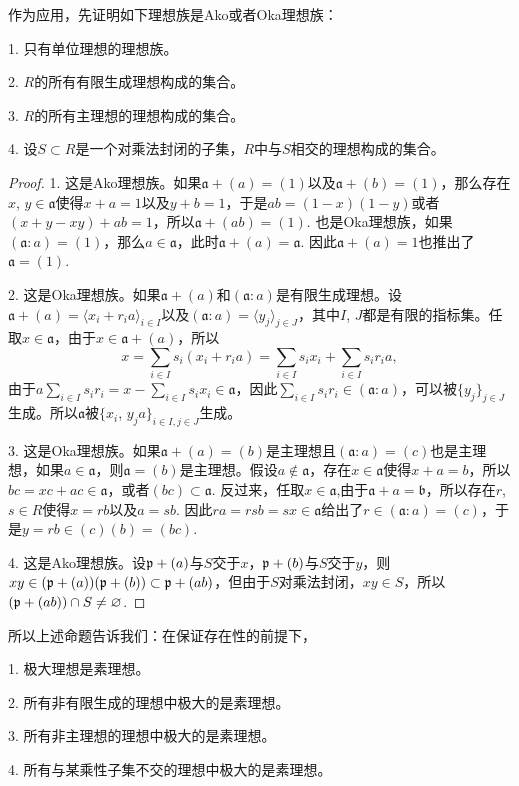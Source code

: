 作为应用，先证明如下理想族是Ako或者Oka理想族：

1. 只有单位理想的理想族。

2. $R$的所有有限生成理想构成的集合。

3. $R$的所有主理想的理想构成的集合。

4. 设$S\subset R$是一个对乘法封闭的子集，$R$中与$S$相交的理想构成的集合。

\begin{proof}
	1. 这是Ako理想族。如果$\mathfrak{a}+(a)=(1)$以及$\mathfrak{a}+(b)=(1)$，那么存在$x$, $y\in \mathfrak{a}$使得$x+a=1$以及$y+b=1$，于是$ab=(1-x)(1-y)$或者$(x+y-xy)+ab=1$，所以$\mathfrak{a}+(ab)=(1)$. 也是Oka理想族，如果$(\mathfrak{a}:a)=(1)$，那么$a\in \mathfrak{a}$，此时$\mathfrak{a}+(a)=\mathfrak{a}$. 因此$\mathfrak{a}+(a)=1$也推出了$\mathfrak{a}=(1)$.

	2. 这是Oka理想族。如果$\mathfrak{a}+(a)$和$(\mathfrak{a}:a)$是有限生成理想。设$\mathfrak{a}+(a)=\langle x_i+r_ia \rangle_{i\in I}$以及$(\mathfrak{a}:a)=\langle y_j\rangle_{j\in J}$，其中$I$, $J$都是有限的指标集。任取$x\in \mathfrak{a}$，由于$x\in \mathfrak{a}+(a)$，所以
	\[
		x= \sum_{i\in I}s_i(x_i+r_ia)=\sum_{i\in I}s_ix_i+\sum_{i\in I}s_ir_ia,
	\]
	由于$a\sum_{i\in I}s_ir_i=x-\sum_{i\in I}s_ix_i\in \mathfrak{a}$，因此$\sum_{i\in I}s_ir_i\in (\mathfrak{a}:a)$，可以被$\{y_j\}_{j\in J}$生成。所以$\mathfrak{a}$被$\{x_i$, $y_ja\}_{i\in I,j\in J}$生成。

	3. 这是Oka理想族。如果$\mathfrak{a}+(a)=(b)$是主理想且$(\mathfrak{a}:a)=(c)$也是主理想，如果$a\in \mathfrak{a}$，则$\mathfrak{a}=(b)$是主理想。假设$a\not\in\mathfrak{a}$，存在$x\in \mathfrak{a}$使得$x+a=b$，所以$bc=xc+ac\in \mathfrak{a}$，或者$(bc)\subset \mathfrak{a}$. 反过来，任取$x\in \mathfrak{a}$,由于$\mathfrak{a}+a=\mathfrak{b}$，所以存在$r$, $s\in R$使得$x=rb$以及$a=sb$. 因此$ra=rsb=sx\in\mathfrak{a}$给出了$r\in (\mathfrak{a}:a)=(c)$，于是$y=rb\in (c)(b)=(bc)$.

	4. 这是Ako理想族。设$\mathfrak{p}+(a)$与$S$交于$x$，$\mathfrak{p}+(b)$与$S$交于$y$，则$xy\in (\mathfrak{p}+(a))(\mathfrak{p}+(b))\subset \mathfrak{p}+(ab)$，但由于$S$对乘法封闭，$xy\in S$，所以$(\mathfrak{p}+(ab))\cap S\neq \varnothing$.
\end{proof}

所以上述命题告诉我们：在保证存在性的前提下，

	1. 极大理想是素理想。

	2. 所有非有限生成的理想中极大的是素理想。

	3. 所有非主理想的理想中极大的是素理想。

	4. 所有与某乘性子集不交的理想中极大的是素理想。

